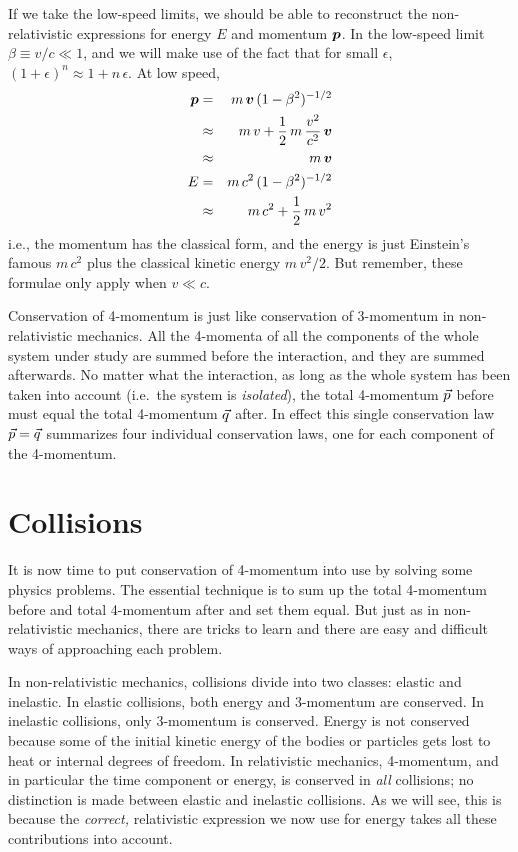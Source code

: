 If we take the low-speed limits, we should be able to
reconstruct the non-relativistic expressions for energy $E$ and
momentum $\mbox{\boldmath $p$}$.  In the low-speed limit $\beta\equiv v/c\ll 1$, and
we will make use of the fact that for small $\epsilon$,
$(1+\epsilon)^n\approx 1+n\,\epsilon$.  At low speed,
\begin{eqnarray}
\mbox{\boldmath $p$} & = & m\,\mbox{\boldmath $v$}\, (1-\beta^2)^{-1/2} \nonumber\\
& \approx & m\,v + \frac{1}{2}\,m\,\frac{v^2}{c^2}\,\mbox{\boldmath $v$} \nonumber\\
& \approx & m\,\mbox{\boldmath $v$} \nonumber\\
E & = & m\, c^2\, (1-\beta^2)^{-1/2} \nonumber\\
& \approx & m\,c^2 + \frac{1}{2}\,m\,v^2
\end{eqnarray}
i.e., the momentum has the classical form, and the energy is just
Einstein's famous $m\,c^2$ plus the classical kinetic energy
$m\,v^2/2$.  But remember, these formulae only apply when $v\ll c$.

Conservation of 4-momentum is just like conservation of 3-momentum in
non-relativistic mechanics.  All the 4-momenta of all the components
of the whole system under study are summed before the interaction, and
they are summed afterwards.  No matter what the interaction, as long
as the whole system has been taken into account (i.e.\ the system is
{\em isolated\/}), the total 4-momentum $\vec{p}$ before must equal the
total 4-momentum $\vec{q}$ after. In effect this single conservation
law $\vec{p}=\vec{q}$ summarizes four individual conservation laws, one
for each component of the 4-momentum.


\section{Collisions}
\label{sec:collisions}

It is now time to put conservation of 4-momentum into use by solving
some physics problems.  The essential technique is to sum up the total
4-momentum before and total 4-momentum after and set them equal.  But
just as in non-relativistic mechanics, there are tricks to learn and
there are easy and difficult ways of approaching each problem.

In non-relativistic mechanics, collisions divide into two classes:
elastic and inelastic.  In elastic collisions, both energy and
3-momentum are conserved.  In inelastic collisions, only 3-momentum is
conserved.  Energy is not conserved because some of the initial
kinetic energy of the bodies or particles gets lost to heat or
internal degrees of freedom.  In relativistic mechanics, 4-momentum,
and in particular the time component or energy, is conserved in {\em
all\/} collisions; no distinction is made between elastic and
inelastic collisions.  As we will see, this is because the {\em
correct,\/} relativistic expression we now use for energy takes all
these contributions into account.

